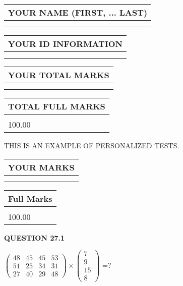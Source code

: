 \documentclass[12pt]{article}
\begin{document}
   
   
   
\noindent\begin{tabular}{|l|}
\hline
YOUR NAME (FIRST, ... LAST)  \\
\hline
 \\ 
 \\ 
\hline
\end{tabular}
\hspace{0.05in} \begin{tabular}{|l|}
\hline
 YOUR   ID   INFORMATION  \\
\hline
 \\ 
 \\ 
\hline
\end{tabular}
   
   
\vspace{0.2in}\noindent\begin{tabular}{|l|}
\hline
YOUR TOTAL MARKS  \\
\hline
 \\ 
 \\ 
\hline
\end{tabular}
\hspace{0.05in} \begin{tabular}{|l|}
\hline
TOTAL FULL MARKS  \\
\hline
 \\ 
100.00 \\
\hline
\end{tabular}
   
   
 \vspace{0.2in}
{\Huge  THIS IS AN EXAMPLE OF}
{\Huge  PERSONALIZED TESTS. }
   
   
  
\vspace{0.2in}
  
\noindent\begin{tabular}{|l|}
\hline
 YOUR MARKS  \\
\hline
 \\ 
 \\ 
\hline
\end{tabular}
\hspace{0.05in} \begin{tabular}{|l|}
\hline
 Full Marks  \\
\hline
 \\ 
100.00 \\
\hline
\end{tabular}
{\textbf{\Large{QUESTION
27.1 
}}}
  
  
 
$ \left( \begin{array}{ccccccccc}
          48  & 
          45  & 
          45  & 
          53  \\ 
          51  & 
          25  & 
          34  & 
          31  \\ 
          27  & 
          40  & 
          29  & 
          48
\end{array}\right) \times
\left( \begin{array}{c}
           7  \\ 
           9  \\ 
          15  \\ 
           8
\end{array}\right) $ =?
 
\end{document}
